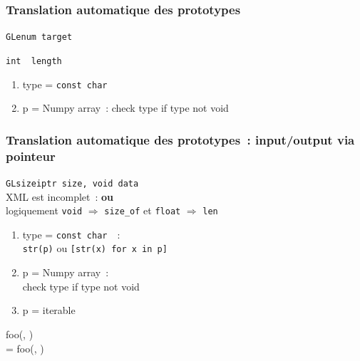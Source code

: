 \begin{frame}
  \frametitle{Translation automatique des prototypes}
  \begin{description}
    \item[simple] \texttt{GLenum target} \\
    \item[output par référence] \texttt{int \alert{\ptr [1]} length} \\
    \item[Pointeur Complexe]
      \begin{enumerate}
      \item type = \texttt{const char \ptr}
      \item p = Numpy array~: check type if type not void
      \end{enumerate}
  \end{description}
\end{frame}

\begin{frame}
  \frametitle{Translation automatique des prototypes~: input/output via pointeur}
  \texttt{GLsizeiptr size,  void  data} \\[.5em]
  \attention{} \alert{XML est incomplet~:  \textbf{ou} } \\
  logiquement \texttt{void} $\Longrightarrow$ \texttt{size\_of} et \texttt{float} $\Longrightarrow$ \texttt{len}
  \vspace{.5em}
  \begin{enumerate}
  \item type = \texttt{const char \ptr\ptr}~:\\
    \texttt{str(p)} ou \texttt{[str(x) for x in p]}
  \item p = Numpy array~:\\
    check type if type not void
  \item p = iterable
  \end{enumerate}
  \vspace{.5em}
   foo(, ) \\
   = foo(, )
\end{frame}

